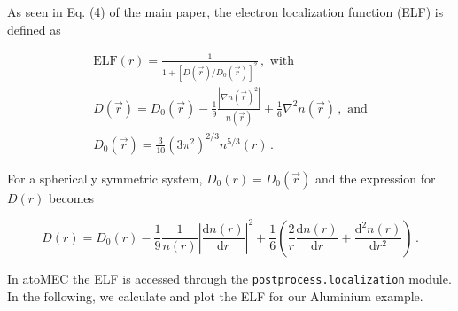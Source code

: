 \documentclass[11pt]{article}
\begin{document}
As seen in Eq. (4) of the main paper, the electron localization function
(ELF) is defined as

\begin{gather}
\textrm{ELF}(r) = \frac{1}{1+[D(\vec{r})/D_0(\vec{r})]^2}\,,\textrm{ with} \\
D(\vec{r}) = D_0(\vec{r}) - \frac{1}{9} \frac{|\nabla n(\vec{r})^2|}{n(\vec{r})} + \frac{1}{6}\nabla^2 n(\vec{r})\,, \textrm{ and} \\
D_0(\vec{r}) = \frac{3}{10}(3\pi^2)^{2/3} n^{5/3}(r)\,.
\end{gather}

For a spherically symmetric system, \(D_0(r)=D_0(\vec{r})\) and the
expression for \(D(r)\) becomes

\begin{equation}
D(r) = D_0(r) - \frac{1}{9} \frac{1}{n(r)} \left| \frac{\textrm{d}n(r)}{\textrm{d}r}\right|^2 + \frac{1}{6} \left(  \frac{2}{r} \frac{\textrm{d}n(r)}{\textrm{d}r} +  \frac{\textrm{d}^2 n(r)}{\textrm{d}r^2}\right)\,.
\end{equation}

In atoMEC the ELF is accessed through the
\texttt{postprocess.localization} module. In the following, we calculate
and plot the ELF for our Aluminium example.
\end{document}

